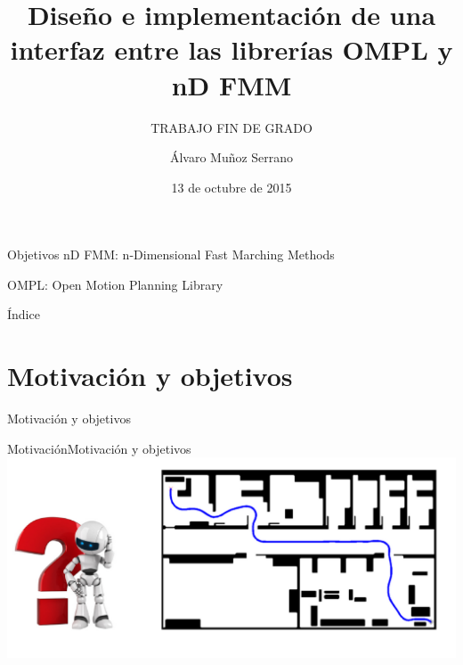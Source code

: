 \documentclass[10pt]{beamer}
\title{Diseño e implementación de una interfaz entre las librerías OMPL y nD FMM \vspace{0.5cm}}
\subtitle{TRABAJO FIN DE GRADO}  %
\date{13 de octubre de 2015}
\author{
Álvaro Muñoz Serrano
}
\institute[
] %
{%
 Departamento de Sistemas y Automática
  
}
\begin{document}
{%
\begin{frame} %
  \titlepage
\end{frame}}

\begin{frame}{Objetivos}
	\large nD FMM: n-Dimensional Fast Marching Methods
	\vspace{1cm}
	
	\large OMPL: Open Motion Planning Library
\end{frame}

\begin{frame}{Índice}{}
\tableofcontents
\end{frame}

\section{Motivación y objetivos}

\begin{frame}
\begin{center}
\vspace{1.5cm}
\huge Motivación y objetivos
\end{center}
\end{frame}

\begin{frame}{Motivación}{Motivación y objetivos}		\includegraphics[width=\textwidth,height=0.8\textheight,keepaspectratio]{dudabot}
\end{frame}
\end{document}
